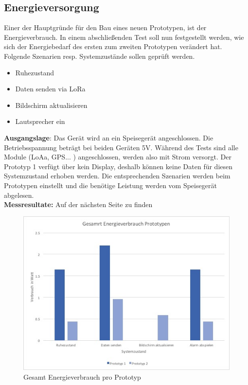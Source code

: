 \documentclass[11pt,english,german]{report}
\theoremstyle{definition}
\begin{document}
\subsection{Energieversorgung}
Einer der Hauptgründe für den Bau eines neuen Prototypen, ist der Energieverbrauch. In einem abschließenden Test soll nun festgestellt werden, wie sich der Energiebedarf des ersten zum zweiten Prototypen verändert hat. Folgende Szenarien resp. Systemzustände sollen geprüft werden.
\begin{itemize}
	\item Ruhezustand
	\item Daten senden via LoRa
	\item Bildschirm aktualisieren
	\item Lautsprecher ein	
\end{itemize}
\textbf{Ausgangslage}: Das Gerät wird an ein Speisegerät angeschlossen. Die Betriebsspannung beträgt bei beiden Geräten 5V. Während des Tests sind alle Module (LoAa, GPS... ) angeschlossen, werden also mit Strom versorgt. Der Prototyp 1 verfügt über kein Display, deshalb können keine Daten für diesen Systemzustand erhoben werden. Die entsprechenden Szenarien werden beim Prototypen einstellt und die benötige Leistung werden vom Speisegerät abgelesen.\\[0.3cm]
\textbf{Messresultate:} Auf der nächsten Seite zu finden
\newpage
\noindent
\begin{figure}[H]
	\centering
	\includegraphics[width=\textwidth]{img/testing/energy_usage.jpg}
	\caption[Gesamt Energieverbrauch pro Prototyp]
	{Gesamt Energieverbrauch pro Prototyp}
\end{figure}
\end{document}
